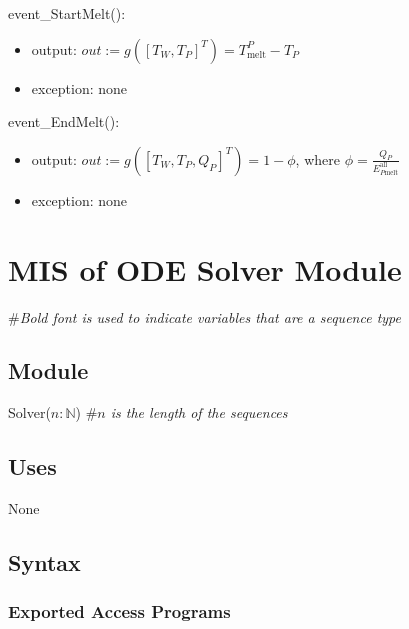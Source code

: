 \documentclass[12pt, titlepage]{article}
\begin{document}
event\_StartMelt(): 
\begin{itemize}
\item output: $out := g([T_W, T_P]^T) = T_\text{melt}^P - T_P$
\item exception: none
\end{itemize}

event\_EndMelt(): 
\begin{itemize}
\item output: $out := g([T_W, T_P, Q_P]^T) = 1 - \phi$, where $\phi = \frac{Q_P}{E_{P\text{melt}}^{\text{all}}}$
\item exception: none
\end{itemize}

\newpage
\section{MIS of ODE Solver Module} \label{ODE}

\#\textit{Bold font is used to indicate variables that are a sequence
  type}

\subsection{Module}

Solver($n: \mathbb{N}$) \#\textit{$n$ is the length of the sequences}

\subsection{Uses}

None

\subsection{Syntax}

\subsubsection{Exported Access Programs}
\end{document}
